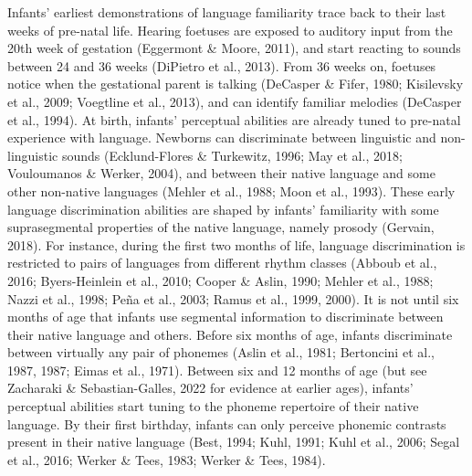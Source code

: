 \documentclass[
  12pt,
  b5paperpaper,
  twoside]{scrreprt}
\begin{document}
Infants' earliest demonstrations of language familiarity trace back to
their last weeks of pre-natal life. Hearing foetuses are exposed to
auditory input from the 20th week of gestation (Eggermont \& Moore,
2011), and start reacting to sounds between 24 and 36 weeks (DiPietro et
al., 2013). From 36 weeks on, foetuses notice when the gestational
parent is talking (DeCasper \& Fifer, 1980; Kisilevsky et al., 2009;
Voegtline et al., 2013), and can identify familiar melodies (DeCasper et
al., 1994). At birth, infants' perceptual abilities are already tuned to
pre-natal experience with language. Newborns can discriminate between
linguistic and non-linguistic sounds (Ecklund-Flores \& Turkewitz, 1996;
May et al., 2018; Vouloumanos \& Werker, 2004), and between their native
language and some other non-native languages (Mehler et al., 1988; Moon
et al., 1993). These early language discrimination abilities are shaped
by infants' familiarity with some suprasegmental properties of the
native language, namely prosody (Gervain, 2018). For instance, during
the first two months of life, language discrimination is restricted to
pairs of languages from different rhythm classes (Abboub et al., 2016;
Byers-Heinlein et al., 2010; Cooper \& Aslin, 1990; Mehler et al., 1988;
Nazzi et al., 1998; Peña et al., 2003; Ramus et al., 1999, 2000). It is
not until six months of age that infants use segmental information to
discriminate between their native language and others. Before six months
of age, infants discriminate between virtually any pair of phonemes
(Aslin et al., 1981; Bertoncini et al., 1987, 1987; Eimas et al., 1971).
Between six and 12 months of age (but see Zacharaki \& Sebastian-Galles,
2022 for evidence at earlier ages), infants' perceptual abilities start
tuning to the phoneme repertoire of their native language. By their
first birthday, infants can only perceive phonemic contrasts present in
their native language (Best, 1994; Kuhl, 1991; Kuhl et al., 2006; Segal
et al., 2016; Werker \& Tees, 1983; Werker \& Tees, 1984).
\end{document}
